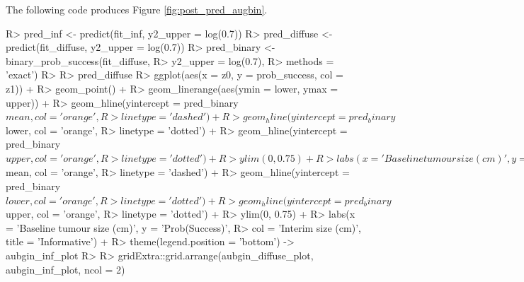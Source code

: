\documentclass[article]{jss}
\begin{document}
The following code produces Figure \ref{fig:post_pred_augbin}.

\begin{CodeChunk}

\begin{CodeInput}
R> pred_inf <- predict(fit_inf, y2_upper = log(0.7))
R> pred_diffuse <- predict(fit_diffuse, y2_upper = log(0.7))
R> pred_binary <- binary_prob_success(fit_diffuse, 
R>                                    y2_upper = log(0.7), 
R>                                    methods = 'exact')
R> 
R> pred_diffuse %
R>   ggplot(aes(x = z0, y = prob_success, col = z1)) + 
R>   geom_point() + 
R>   geom_linerange(aes(ymin = lower, ymax = upper)) + 
R>   geom_hline(yintercept = pred_binary$mean, col = 'orange', 
R>              linetype = 'dashed') +
R>   geom_hline(yintercept = pred_binary$lower, col = 'orange', 
R>              linetype = 'dotted') +
R>   geom_hline(yintercept = pred_binary$upper, col = 'orange', 
R>              linetype = 'dotted') +
R>   ylim(0, 0.75) + 
R>   labs(x = 'Baseline tumour size (cm)', y = 'Prob(Success)', 
R>        col = 'Interim size (cm)', title = 'Diffuse') + 
R>   theme(legend.position = 'bottom') -> aubgin_diffuse_plot
R> 
R> pred_inf %
R>   ggplot(aes(x = z0, y = prob_success, col = z1)) + 
R>   geom_point() + 
R>   geom_linerange(aes(ymin = lower, ymax = upper)) + 
R>   geom_hline(yintercept = pred_binary$mean, col = 'orange', 
R>              linetype = 'dashed') +
R>   geom_hline(yintercept = pred_binary$lower, col = 'orange', 
R>              linetype = 'dotted') +
R>   geom_hline(yintercept = pred_binary$upper, col = 'orange', 
R>              linetype = 'dotted') +
R>   ylim(0, 0.75) + 
R>   labs(x = 'Baseline tumour size (cm)', y = 'Prob(Success)', 
R>        col = 'Interim size (cm)', title = 'Informative') + 
R>   theme(legend.position = 'bottom') -> aubgin_inf_plot
R> 
R> gridExtra::grid.arrange(aubgin_diffuse_plot, aubgin_inf_plot, ncol = 2)
\end{CodeInput}
\end{CodeChunk}


\end{document}

